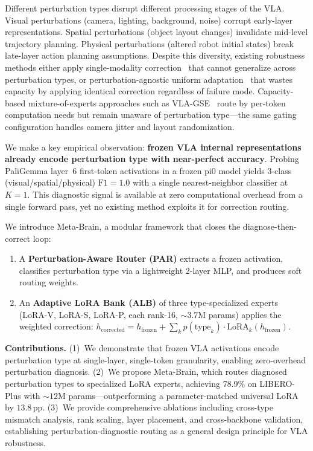 \documentclass[10pt,twocolumn]{article}
\newcommand{\ours}{Meta-Brain}
\newcommand{\liplus}{LIBERO-Plus}
\newcommand{\pp}{\,\text{pp}}
\begin{document}
Different perturbation types disrupt different processing stages of the VLA.
Visual perturbations (camera, lighting, background, noise) corrupt early-layer representations.
Spatial perturbations (object layout changes) invalidate mid-level trajectory planning.
Physical perturbations (altered robot initial states) break late-layer action planning assumptions.
Despite this diversity, existing robustness methods either apply single-modality correction~\cite{yang2025ftm,yang2025fla} that cannot generalize across perturbation types, or perturbation-agnostic uniform adaptation~\cite{luo2025robustvla,chen2025srpo} that wastes capacity by applying identical correction regardless of failure mode.
Capacity-based mixture-of-experts approaches such as VLA-GSE~\cite{vlagserouting2026} route by per-token computation needs but remain unaware of perturbation type---the same gating configuration handles camera jitter and layout randomization.

We make a key empirical observation: \textbf{frozen VLA internal representations already encode perturbation type with near-perfect accuracy}.
Probing PaliGemma layer~6 first-token activations in a frozen pi0 model yields 3-class (visual/spatial/physical) $\text{F1}{=}1.0$ with a single nearest-neighbor classifier at $K{=}1$.
This diagnostic signal is available at zero computational overhead from a single forward pass, yet no existing method exploits it for correction routing.

We introduce \ours{}, a modular framework that closes the diagnose-then-correct loop:
\begin{enumerate}
    \item A \textbf{Perturbation-Aware Router (PAR)} extracts a frozen activation, classifies perturbation type via a lightweight 2-layer MLP, and produces soft routing weights.
    \item An \textbf{Adaptive LoRA Bank (ALB)} of three type-specialized experts (LoRA-V, LoRA-S, LoRA-P, each rank-16, ${\sim}3.7$M params) applies the weighted correction: $h_{\text{corrected}} = h_{\text{frozen}} + \sum_k p(\text{type}_k) \cdot \text{LoRA}_k(h_{\text{frozen}})$.
\end{enumerate}

\noindent\textbf{Contributions.}
(1)~We demonstrate that frozen VLA activations encode perturbation type at single-layer, single-token granularity, enabling zero-overhead perturbation diagnosis.
(2)~We propose \ours{}, which routes diagnosed perturbation types to specialized LoRA experts, achieving 78.9\% on \liplus{} with ${\sim}12$M params---outperforming a parameter-matched universal LoRA by $13.8\pp$.
(3)~We provide comprehensive ablations including cross-type mismatch analysis, rank scaling, layer placement, and cross-backbone validation, establishing perturbation-diagnostic routing as a general design principle for VLA robustness.
\end{document}
